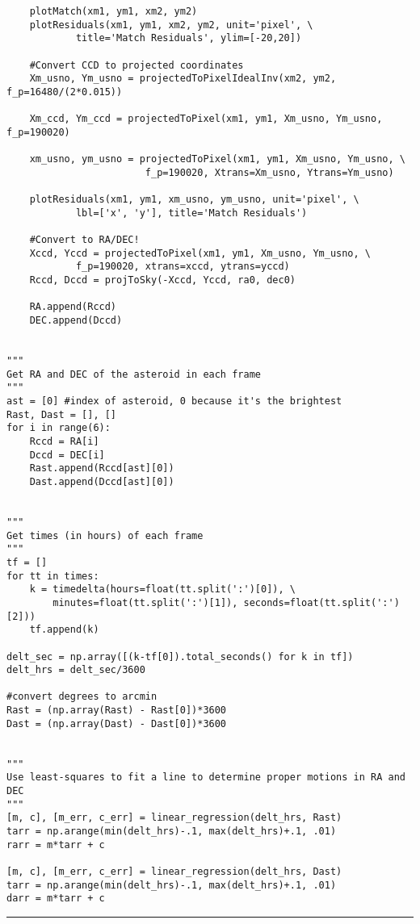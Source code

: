 \documentclass[preprint]{aastex62}
\begin{document}
\begin{lstlisting}
    plotMatch(xm1, ym1, xm2, ym2)
    plotResiduals(xm1, ym1, xm2, ym2, unit='pixel', \
            title='Match Residuals', ylim=[-20,20])

    #Convert CCD to projected coordinates
    Xm_usno, Ym_usno = projectedToPixelIdealInv(xm2, ym2, f_p=16480/(2*0.015))

    Xm_ccd, Ym_ccd = projectedToPixel(xm1, ym1, Xm_usno, Ym_usno, f_p=190020)

    xm_usno, ym_usno = projectedToPixel(xm1, ym1, Xm_usno, Ym_usno, \
                        f_p=190020, Xtrans=Xm_usno, Ytrans=Ym_usno)
    
    plotResiduals(xm1, ym1, xm_usno, ym_usno, unit='pixel', \
            lbl=['x', 'y'], title='Match Residuals')

    #Convert to RA/DEC!
    Xccd, Yccd = projectedToPixel(xm1, ym1, Xm_usno, Ym_usno, \
            f_p=190020, xtrans=xccd, ytrans=yccd)
    Rccd, Dccd = projToSky(-Xccd, Yccd, ra0, dec0)
    
    RA.append(Rccd)
    DEC.append(Dccd)


"""
Get RA and DEC of the asteroid in each frame
"""
ast = [0] #index of asteroid, 0 because it's the brightest
Rast, Dast = [], []
for i in range(6):
    Rccd = RA[i]
    Dccd = DEC[i]
    Rast.append(Rccd[ast][0])
    Dast.append(Dccd[ast][0])
    

"""
Get times (in hours) of each frame
"""
tf = []
for tt in times:
    k = timedelta(hours=float(tt.split(':')[0]), \
        minutes=float(tt.split(':')[1]), seconds=float(tt.split(':')[2]))
    tf.append(k)
    
delt_sec = np.array([(k-tf[0]).total_seconds() for k in tf])
delt_hrs = delt_sec/3600

#convert degrees to arcmin
Rast = (np.array(Rast) - Rast[0])*3600
Dast = (np.array(Dast) - Dast[0])*3600


"""
Use least-squares to fit a line to determine proper motions in RA and DEC
"""
[m, c], [m_err, c_err] = linear_regression(delt_hrs, Rast)
tarr = np.arange(min(delt_hrs)-.1, max(delt_hrs)+.1, .01)
rarr = m*tarr + c

[m, c], [m_err, c_err] = linear_regression(delt_hrs, Dast)
tarr = np.arange(min(delt_hrs)-.1, max(delt_hrs)+.1, .01)
darr = m*tarr + c
\end{lstlisting}
\hrule \vspace{7pt}
\end{document}
